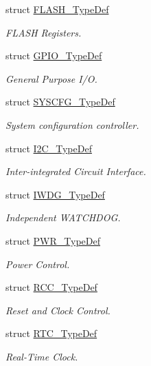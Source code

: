 \begin{DoxyCompactItemize}
struct \hyperlink{struct_f_l_a_s_h___type_def}{F\+L\+A\+S\+H\+\_\+\+Type\+Def}
\begin{DoxyCompactList}\small\item\em F\+L\+A\+SH Registers. \end{DoxyCompactList}\item 
struct \hyperlink{struct_g_p_i_o___type_def}{G\+P\+I\+O\+\_\+\+Type\+Def}
\begin{DoxyCompactList}\small\item\em General Purpose I/O. \end{DoxyCompactList}\item 
struct \hyperlink{struct_s_y_s_c_f_g___type_def}{S\+Y\+S\+C\+F\+G\+\_\+\+Type\+Def}
\begin{DoxyCompactList}\small\item\em System configuration controller. \end{DoxyCompactList}\item 
struct \hyperlink{struct_i2_c___type_def}{I2\+C\+\_\+\+Type\+Def}
\begin{DoxyCompactList}\small\item\em Inter-\/integrated Circuit Interface. \end{DoxyCompactList}\item 
struct \hyperlink{struct_i_w_d_g___type_def}{I\+W\+D\+G\+\_\+\+Type\+Def}
\begin{DoxyCompactList}\small\item\em Independent W\+A\+T\+C\+H\+D\+OG. \end{DoxyCompactList}\item 
struct \hyperlink{struct_p_w_r___type_def}{P\+W\+R\+\_\+\+Type\+Def}
\begin{DoxyCompactList}\small\item\em Power Control. \end{DoxyCompactList}\item 
struct \hyperlink{struct_r_c_c___type_def}{R\+C\+C\+\_\+\+Type\+Def}
\begin{DoxyCompactList}\small\item\em Reset and Clock Control. \end{DoxyCompactList}\item 
struct \hyperlink{struct_r_t_c___type_def}{R\+T\+C\+\_\+\+Type\+Def}
\begin{DoxyCompactList}\small\item\em Real-\/\+Time Clock. \end{DoxyCompactList}\item 

\end{DoxyCompactItemize}
